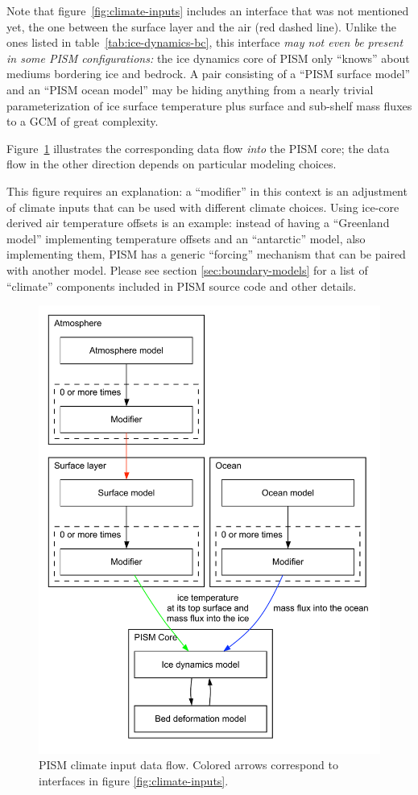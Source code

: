 \documentclass[11pt,final]{amsart}
\begin{document}
Note that figure~\ref{fig:climate-inputs} includes an interface that was not
mentioned yet, the one between the surface layer and the air (red dashed line).
Unlike the ones listed in table~\ref{tab:ice-dynamics-bc}, this interface
\emph{may not even be present in some PISM configurations:} the ice dynamics
core of PISM only ``knows'' about mediums bordering ice and bedrock. A pair
consisting of a ``PISM surface model'' and an ``PISM ocean model'' may be
hiding anything from a nearly trivial parameterization of ice surface
temperature plus surface and sub-shelf mass fluxes to a GCM of great
complexity.

Figure~\ref{fig:climate-input-data-flow} illustrates the corresponding data
flow \emph{into} the PISM core; the data flow in the other direction depends on
particular modeling choices.

This figure requires an explanation: a ``modifier'' in this context is an
adjustment of climate inputs that can be used with different climate
choices.  Using ice-core derived air temperature offsets is an example: instead
of having a ``Greenland model'' implementing temperature offsets and an
``antarctic'' model, also implementing them, PISM has a generic ``forcing''
mechanism that can be paired with another model. Please see section \ref{sec:boundary-models} for
a list of ``climate'' components included in PISM source code and other details.

\begin{figure}
  \centering
  \includegraphics[width=5in]{figs/data-flow.pdf}
  \caption{PISM climate input data flow. Colored arrows correspond to interfaces in
    figure \ref{fig:climate-inputs}.}
  \label{fig:climate-input-data-flow}
\end{figure}
\end{document}

